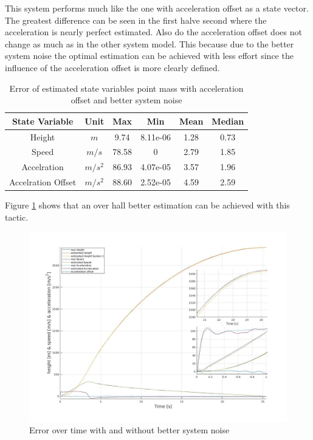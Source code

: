 This system performs much like the one with acceleration offset as a state vector.
The greatest difference can be seen in the first halve second where the acceleration is nearly perfect estimated.
Also do the acceleration offset does not change as much as in the other system model.
This because due to the better system noise the optimal estimation can be achieved with less effort since the influence of the acceleration offset is more clearly defined.

\begin{table}[h!]
\centering
\begin{tabular}{cccccc}
\hline
\multicolumn{1}{|c|}{State Variable} & \multicolumn{1}{c|}{Unit} & \multicolumn{1}{c|}{Max} & \multicolumn{1}{c|}{Min} & \multicolumn{1}{c|}{Mean} & \multicolumn{1}{c|}{Median} \\ \hline
Height                            & $m$                         & 9.74	                  & 8.11e-06                 & 1.28                    & 0.73                      \\
Speed                             & $m/s$                       & 78.58                   & 0                        & 2.79                    & 1.85                      \\
Accelration                       & $m/s^2$   			& 86.93                   & 4.07e-05                 & 3.57                    & 1.96                     \\
Accelration Offset                & $m/s^2$   			& 88.60                   & 2.52e-05                 & 4.59                    & 2.59                     
\end{tabular}
\caption{Error of estimated state variables point mass with acceleration offset and better system noise}
\label{tab:ErrorPointMassBetterNoise}
\end{table}

Figure \ref{fig:PointMassVSBetterNoise} shows that an over hall better estimation can be achieved with this tactic. 
\begin{figure}[h!]
 \centering
 \includegraphics[width=.8\textwidth]{./Pictures/PointMassVSBetterNoise.jpg}
 \caption{Error over time with and without better system noise}
 \label{fig:PointMassVSBetterNoise}
\end{figure}


